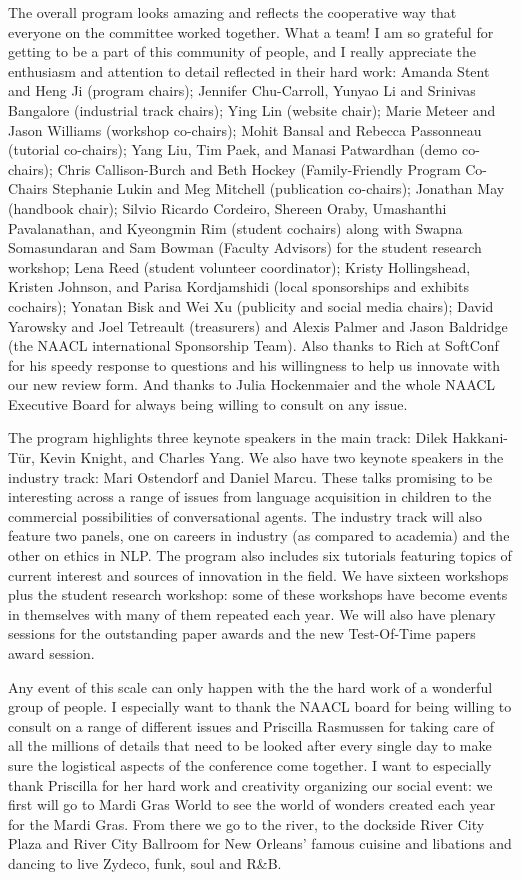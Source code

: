 The overall program looks amazing and reflects the cooperative way
that everyone on the committee worked together. What a team! I am so
grateful for getting to be a part of this community of people, and I
really appreciate the enthusiasm and attention to detail reflected in
their hard work: Amanda Stent and Heng Ji (program chairs); Jennifer
Chu-Carroll, Yunyao Li and Srinivas Bangalore (industrial track
chairs); Ying Lin (website chair); Marie Meteer and Jason Williams
(workshop co-chairs); Mohit Bansal and Rebecca Passonneau (tutorial
co-chairs); Yang Liu, Tim Paek, and Manasi Patwardhan (demo
co-chairs); Chris Callison-Burch and Beth Hockey (Family-Friendly
Program Co-Chairs Stephanie Lukin and Meg Mitchell (publication
co-chairs); Jonathan May (handbook chair); Silvio Ricardo Cordeiro,
Shereen Oraby, Umashanthi Pavalanathan, and Kyeongmin Rim (student
cochairs) along with Swapna Somasundaran and Sam Bowman (Faculty
Advisors) for the student research workshop; Lena Reed (student
volunteer coordinator); Kristy Hollingshead, Kristen Johnson, and
Parisa Kordjamshidi (local sponsorships and exhibits cochairs);
Yonatan Bisk and Wei Xu (publicity and social media chairs); David
Yarowsky and Joel Tetreault (treasurers) and Alexis Palmer and Jason
Baldridge (the NAACL international Sponsorship Team). Also thanks to
Rich at SoftConf for his speedy response to questions and his
willingness to help us innovate with our new review form. And thanks
to Julia Hockenmaier and the whole NAACL Executive Board for always
being willing to consult on any issue.

The program highlights three keynote speakers in the main track: Dilek
Hakkani-T\"{u}r, Kevin Knight, and Charles Yang. We also have two keynote
speakers in the industry track: Mari Ostendorf and Daniel Marcu. These
talks promising to be interesting across a range of issues from
language acquisition in children to the commercial possibilities
of conversational agents. The industry track will also feature
two panels, one on careers in industry (as compared to academia)
and the other on ethics in
NLP. The program also includes six tutorials featuring topics
of current interest and sources of innovation in the field.
We have sixteen workshops
plus the student research workshop: some of these workshops have become
events in themselves with many of them repeated each year.
We will also have plenary sessions for the outstanding paper awards and the
new Test-Of-Time papers award session. 

Any event of this scale can only happen with the the hard work of a
wonderful group of people. I especially want to thank the NAACL board
for being willing to consult on a range of different issues and
Priscilla Rasmussen for taking care of all the millions of details
that need to be looked after every single day to make sure the
logistical aspects of the conference come together.  I want to
especially thank Priscilla for her hard work and creativity organizing
our social event: we first will go to Mardi Gras World to see the
world of wonders created each year for the Mardi Gras. From there we
go to the river, to the dockside River City Plaza and River City
Ballroom for New Orleans' famous cuisine and libations and dancing to
live Zydeco, funk, soul and R\&B.

